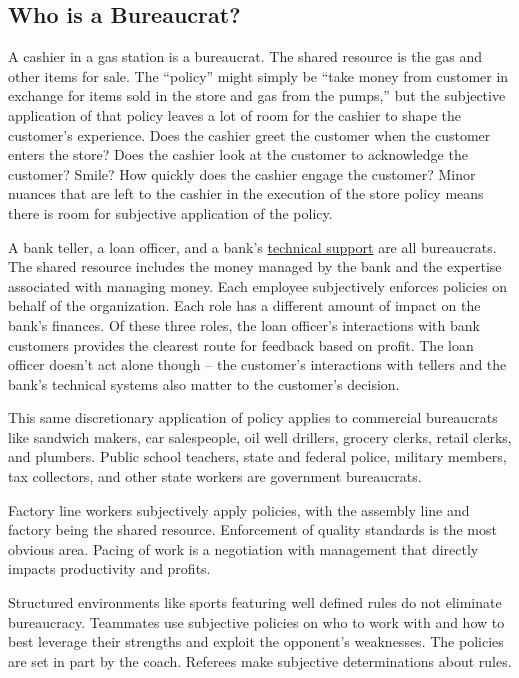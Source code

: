 \subsection*{Who is a Bureaucrat?}

A cashier in a gas station is a bureaucrat. The shared resource is the gas and other items for sale. The ``policy'' might simply be ``take money from customer in exchange for items sold in the store and gas from the pumps,'' but the subjective application of that policy leaves a lot of room for the cashier to shape the customer's experience. Does the cashier greet the customer when the customer enters the store? Does the cashier look at the customer to acknowledge the customer? Smile? How quickly does the cashier engage the customer? Minor nuances that are left to the cashier in the execution of the store policy means there is room for subjective application of the policy. 

A bank teller, a loan officer, and a bank's \href{https://en.wikipedia.org/wiki/Technical_support}{technical support} are all bureaucrats. The shared resource includes the money managed by the bank and the expertise associated with managing money. Each employee subjectively enforces policies on behalf of the organization. Each role has a different amount of impact on the bank's finances. Of these three roles, the loan officer's interactions with bank customers provides the clearest route for feedback based on profit. The loan officer doesn't act alone though -- the customer's interactions with tellers and the bank's technical systems also matter to the customer's decision. 


This same discretionary application of policy applies to commercial bureaucrats like sandwich makers, car salespeople, oil well drillers, grocery clerks, retail clerks, and plumbers. Public school teachers, state and federal police, military members, tax collectors, and other state workers are government bureaucrats. 


Factory line workers subjectively apply policies, with the assembly line and factory being the shared resource. Enforcement of quality standards is the most obvious area. Pacing of work is a negotiation with management that directly impacts productivity and profits. %

Structured environments like sports featuring well defined rules do not eliminate bureaucracy. Teammates use subjective policies on who to work with and how to best leverage their strengths and exploit the opponent's weaknesses. The policies are set in part by the coach. Referees make subjective determinations about rules.

